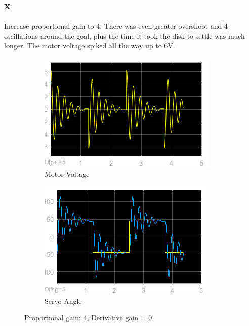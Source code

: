 \documentclass[12pt]{article}
\begin{document}
\subsection*{x} %
Increase proportional gain to 4. There was even greater overshoot and 4 oscillations around the goal, plus the time it took the disk to settle was much longer. The motor voltage spiked all the way up to 6V.
\begin{figure}[h!]
    \centering
    \begin{subfigure}[b]{0.49\textwidth}
        \includegraphics[width=\textwidth]{x_voltage}
        \caption{Motor Voltage}
    \end{subfigure}
    \begin{subfigure}[b]{0.49\textwidth}
        \includegraphics[width=\textwidth]{x_angle}
        \caption{Servo Angle}
    \end{subfigure}
    \caption{\label{fig:x} Proportional gain: 4, Derivative gain = 0}
\end{figure}
\end{document}
